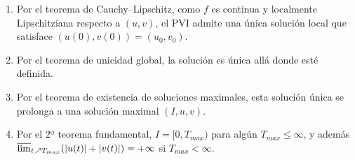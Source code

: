 {        \begin{enumerate}
            \item Por el teorema de Cauchy--Lipschitz, como $f$ es continua y localmente Lipschitziana respecto a $(u,v)$, el PVI admite una única solución local que satisface $(u(0),v(0))=(u_0,v_0)$.
            \item Por el teorema de unicidad global, la solución es única allá donde esté definida.
            \item Por el teorema de existencia de soluciones maximales, esta solución única se prolonga a una solución maximal $(I,u,v)$.
            \item Por el 2º teorema fundamental, $I = [0, T_{max})$ para algún $T_{max} \leq \infty$, y además $\varlimsup_{t \nearrow T_{max}} ( |u(t)| + |v(t)| ) = +\infty$ si $T_{max} < \infty$.
        \end{enumerate}
}

